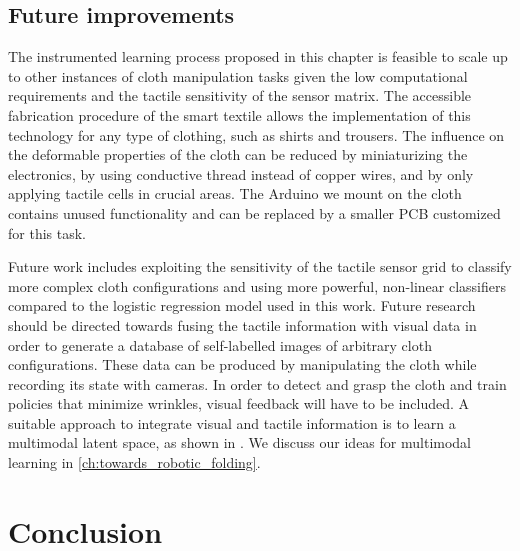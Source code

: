 \documentclass[\home/main.tex]{subfiles}
\begin{document}
\subsection{Future improvements}

The instrumented learning process proposed in this chapter is feasible to scale up to other instances of cloth manipulation tasks given the low computational requirements and the tactile sensitivity of the sensor matrix. The accessible fabrication procedure of the smart textile allows the implementation of this technology for any type of clothing, such as shirts and trousers. The influence on the deformable properties of the cloth can be reduced by miniaturizing the electronics, by using conductive thread instead of copper wires, and by only applying tactile cells in crucial areas. The Arduino we mount on the cloth contains unused functionality and can be replaced by a smaller PCB customized for this task.

Future work includes exploiting the sensitivity of the tactile sensor grid to classify more complex cloth configurations and using more powerful, non-linear classifiers compared to the logistic regression model used in this work. Future research should be directed towards fusing the tactile information with visual data in order to generate a database of self-labelled images of arbitrary cloth configurations. These data can be produced by manipulating the cloth while recording its state with cameras. In order to detect and grasp the cloth and train policies that minimize wrinkles, visual feedback will have to be included. A suitable approach to integrate visual and tactile information is to learn a multimodal latent space, as shown in \autocite{Lee2019}. We discuss our ideas for multimodal learning in \cref{ch:towards_robotic_folding}.



\section{Conclusion} \label{sec:instrumentation_conclusion}
\end{document}
